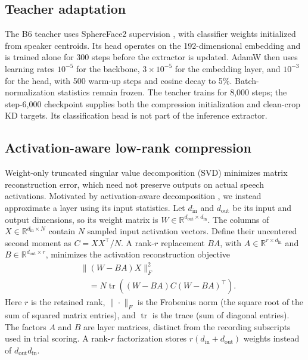 \documentclass[11pt]{article}
\begin{document}
\subsection{Teacher adaptation}
The B6 teacher uses SphereFace2 supervision \citep{wen2022sphereface2}, with classifier weights initialized from speaker centroids. Its head operates on the 192-dimensional embedding and is trained alone for 300 steps before the extractor is updated. AdamW then uses learning rates $10^{-5}$ for the backbone, $3\!\times\!10^{-5}$ for the embedding layer, and $10^{-3}$ for the head, with 500 warm-up steps and cosine decay to 5\%. Batch-normalization statistics remain frozen. The teacher trains for 8,000 steps; the step-6,000 checkpoint supplies both the compression initialization and clean-crop KD targets. Its classification head is not part of the inference extractor.

\subsection{Activation-aware low-rank compression}
Weight-only truncated singular value decomposition (SVD) minimizes matrix reconstruction error, which need not preserve outputs on actual speech activations. Motivated by activation-aware decomposition \citep{yuan2023asvd}, we instead approximate a layer using its input statistics. Let $d_{\mathrm{in}}$ and $d_{\mathrm{out}}$ be its input and output dimensions, so its weight matrix is $W\in\mathbb R^{d_{\mathrm{out}}\times d_{\mathrm{in}}}$. The columns of $X\in\mathbb R^{d_{\mathrm{in}}\times N}$ contain $N$ sampled input activation vectors. Define their uncentered second moment as $C=XX^\top/N$. A rank-$r$ replacement $BA$, with $A\in\mathbb R^{r\times d_{\mathrm{in}}}$ and $B\in\mathbb R^{d_{\mathrm{out}}\times r}$, minimizes the activation reconstruction objective
\begin{equation}
 \begin{aligned}
 &\|(W-BA)X\|_F^2 \\
 &\quad=N\operatorname{tr}((W-BA)C(W-BA)^\top).
 \end{aligned}
\end{equation}
Here $r$ is the retained rank, $\|\cdot\|_F$ is the Frobenius norm (the square root of the sum of squared matrix entries), and $\operatorname{tr}$ is the trace (sum of diagonal entries). The factors $A$ and $B$ are layer matrices, distinct from the recording subscripts used in trial scoring. A rank-$r$ factorization stores $r(d_{\mathrm{in}}+d_{\mathrm{out}})$ weights instead of $d_{\mathrm{out}}d_{\mathrm{in}}$.
\end{document}
